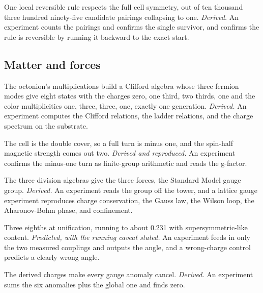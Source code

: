 \begin{finding}
One local reversible rule respects the full cell symmetry, out of ten thousand three hundred ninety-five candidate pairings collapsing to one. \emph{Derived.} An experiment counts the pairings and confirms the single survivor, and confirms the rule is reversible by running it backward to the exact start.
\end{finding}

\subsection*{Matter and forces}

\begin{finding}
The octonion's multiplications build a Clifford algebra whose three fermion modes give eight states with the charges zero, one third, two thirds, one and the color multiplicities one, three, three, one, exactly one generation. \emph{Derived.} An experiment computes the Clifford relations, the ladder relations, and the charge spectrum on the substrate.
\end{finding}

\begin{finding}
The cell is the double cover, so a full turn is minus one, and the spin-half magnetic strength comes out two. \emph{Derived and reproduced.} An experiment confirms the minus-one turn as finite-group arithmetic and reads the g-factor.
\end{finding}

\begin{finding}
The three division algebras give the three forces, the Standard Model gauge group. \emph{Derived.} An experiment reads the group off the tower, and a lattice gauge experiment reproduces charge conservation, the Gauss law, the Wilson loop, the Aharonov-Bohm phase, and confinement.
\end{finding}

\begin{finding}
Three eighths at unification, running to about 0.231 with supersymmetric-like content. \emph{Predicted, with the running caveat stated.} An experiment feeds in only the two measured couplings and outputs the angle, and a wrong-charge control predicts a clearly wrong angle.
\end{finding}

\begin{finding}
The derived charges make every gauge anomaly cancel. \emph{Derived.} An experiment sums the six anomalies plus the global one and finds zero.
\end{finding}

